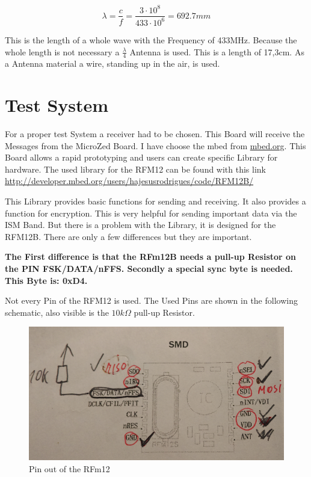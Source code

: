 \begin{equation}
	\lambda = \frac{c}{f} = \frac{3\cdot 10^{8}}{433 \cdot 10^{6}} =  692.7mm
\end{equation}

This is the length of a whole wave with the Frequency of 433MHz. Because the whole length is not necessary a $\frac{\lambda}{4}$ Antenna is used.
This is a length of 17,3cm. As a Antenna material a wire, standing up in the air, is used.

\section{Test System}

For a proper test System a receiver had to be chosen. This Board will receive the Messages from the MicroZed Board. I have choose the mbed from \url{mbed.org}. This Board allows a rapid prototyping and users can create specific Library for hardware. The used library for the RFM12 can be found with this link \url{http://developer.mbed.org/users/hajesusrodrigues/code/RFM12B/}\newline

This Library provides basic functions for sending and receiving. It also provides a function for encryption. This is very helpful for sending important data via the ISM Band. But there is a problem with the Library, it is designed for the RFM12B. There are only a few differences but they are important. \newline

\textbf{The First difference is that the RFm12B needs a pull-up Resistor on the PIN FSK/DATA/nFFS. Secondly a special sync byte is needed. This Byte is: 0xD4.}\newline 

Not every Pin of the RFM12 is used. The Used Pins are shown in the following schematic, also visible is the $10k\Omega$ pull-up Resistor.
\begin{figure}[H]
	\centering
		\includegraphics[width=1.00\textwidth]{picture/rfm12_connection.png}
	\caption{Pin out of the RFm12}
	\label{fig:rfm12_pinout}
\end{figure}

